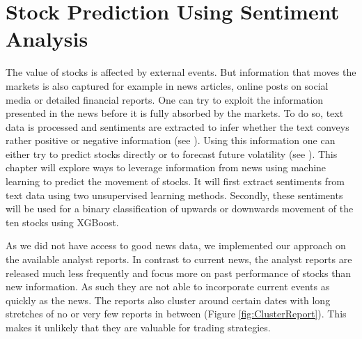\chapter{Stock Prediction Using Sentiment Analysis} \label{ch:predictions_ml}
The value of stocks is affected by external events. But information that moves the markets is also captured for example in news articles, online posts on social media or detailed financial reports. One can try to exploit the information presented in the news before it is fully absorbed by the markets. To do so, text data is processed and sentiments are extracted to infer whether the text conveys rather positive or negative information (see \citet{HADDI201326}). Using this information one can either try to predict stocks directly or to forecast future volatility (see \citet{robertson2007news}). This chapter will explore ways to leverage information from news using machine learning to predict the movement of stocks. It will first extract sentiments from text data using two unsupervised learning methods. Secondly, these sentiments will be used for a binary classification of upwards or downwards movement of the ten stocks using XGBoost.

As we did not have access to good news data, we implemented our approach on the available analyst reports. In contrast to current news, the analyst reports are released much less frequently  and focus more on past performance of stocks than new information. As such they are not able to incorporate current events as quickly as the news. The reports also cluster around certain dates with long stretches of no or very few reports in between (Figure \ref{fig:ClusterReport}). This makes it unlikely that they are valuable for trading strategies.
\\ 
